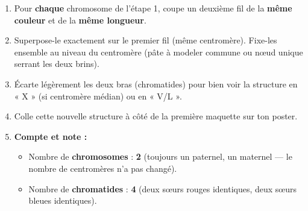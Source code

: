 \documentclass[11pt]{article}
\begin{document}
\begin{enumerate}
    \item Pour \textbf{chaque} chromosome de l'étape 1, coupe un deuxième fil de la \textbf{même couleur} et de la \textbf{même longueur}.
    \item Superpose-le exactement sur le premier fil (même centromère). Fixe-les ensemble au niveau du centromère (pâte à modeler commune ou nœud unique serrant les deux brins).
    \item Écarte légèrement les deux bras (chromatides) pour bien voir la structure en « X » (si centromère médian) ou en « V/L ».
    \item Colle cette nouvelle structure à côté de la première maquette sur ton poster.
    \item \textbf{Compte et note :}
    \begin{itemize}
        \item Nombre de \textbf{chromosomes} : \textbf{2} (toujours un paternel, un maternel — le nombre de centromères n'a pas changé).
        \item Nombre de \textbf{chromatides} : \textbf{4} (deux sœurs rouges identiques, deux sœurs bleues identiques).
    \end{itemize}
\end{enumerate}
\end{document}
